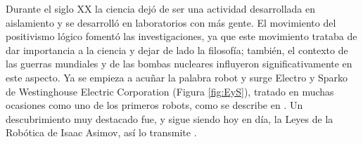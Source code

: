 

Durante el siglo XX la ciencia dejó de ser una actividad desarrollada en aislamiento y se desarrolló en laboratorios con más gente. El movimiento del positivismo lógico fomentó las investigaciones, ya que este movimiento trataba de dar importancia a la ciencia y dejar de lado la filosofía; también, el contexto de las guerras mundiales y de las bombas nucleares influyeron significativamente en este aspecto. Ya se empieza a acuñar la palabra robot y surge Electro y Sparko de Westinghouse Electric Corporation (Figura \ref{fig:EyS}), tratado en muchas ocasiones como uno de los primeros robots, como se describe en \cite{ceccarelli2012service}. Un descubrimiento muy destacado fue, y sigue siendo hoy en día, la Leyes de la Robótica de Isaac Asimov, así lo transmite \cite{asimov2013suenos}.


